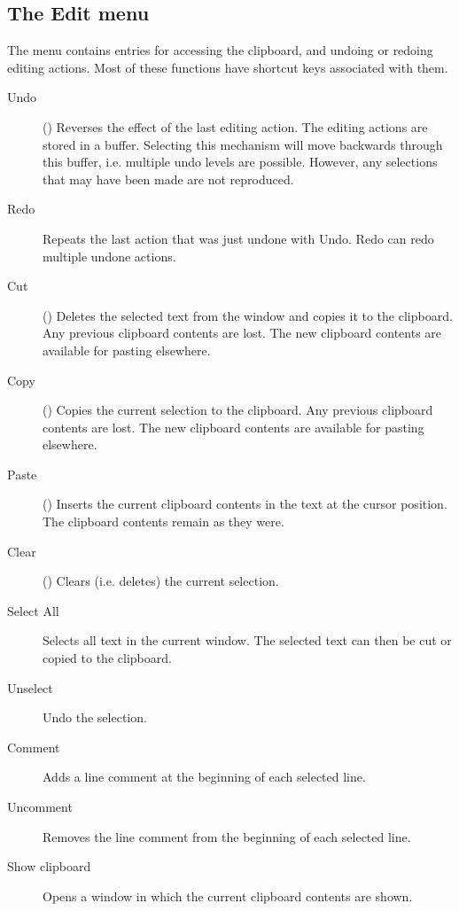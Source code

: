 %
%
\subsection{The Edit menu}
\label{se:menuedit}
The  menu contains entries for accessing the clipboard, and
undoing or redoing editing actions. Most of these functions have shortcut
keys associated with them.
\begin{description}
\item[Undo] () Reverses the effect of the last editing action.
The editing actions are stored in a buffer.
Selecting this mechanism will move backwards through this buffer, i.e.
multiple undo levels are possible. 
However, any selections that may have been made are not reproduced.
\item[Redo] Repeats the last action that was just undone with Undo.
Redo can redo multiple undone actions.
\item[Cut] () Deletes the selected text from the window and
copies it to the clipboard. Any previous clipboard contents are lost. 
The new clipboard contents are available for pasting elsewhere.
\item[Copy] () Copies the current selection to the clipboard.
Any previous clipboard contents are lost. The new clipboard
contents are available for pasting elsewhere.
\item[Paste] () Inserts the current clipboard contents in the
text at the cursor position. The clipboard contents remain as they were.  
\item[Clear] () Clears (i.e. deletes) the current
selection.
\item[Select All] Selects all text in the current window. The selected
text can then be cut or copied to the clipboard.
\item[Unselect] Undo the selection.
\item[Comment] Adds a line comment at the beginning of each selected line.
\item[Uncomment] Removes the line comment from the beginning of each selected line.
\item[Show clipboard] Opens a window in which the current clipboard contents
are shown.
\end{description}
